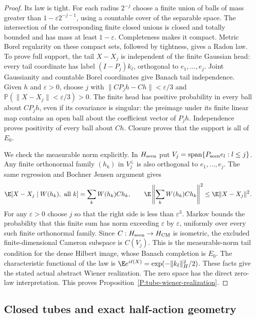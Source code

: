 \begin{proof}
  Its law is tight. For each radius $2^{-j}$ choose a finite union
  of balls of mass greater than $1-\varepsilon2^{-j-1}$,
  using a countable cover of the separable space.
  The intersection of the corresponding finite closed unions
  is closed and totally bounded and has mass at least $1-\varepsilon$.
  Completeness makes it compact.
  Metric Borel regularity on these compact sets, followed by tightness,
  gives a Radon law.
  To prove full support, the tail $X-X_j$ is independent of the
  finite Gaussian head: every tail coordinate has label
  $(I-P_j)k_\ell$, orthogonal to $e_1,\ldots,e_j$.
  Joint Gaussianity and countable Borel coordinates give Banach
  tail independence.
  Given $h$ and $\varepsilon>0$, choose $j$ with
  $\|CP_jh-Ch\|<\varepsilon/3$ and
  $\mathbb P(\|X-X_j\|<\varepsilon/3)>0$.
  The finite head has positive probability in every ball about
  $CP_jh$, even if its covariance is singular:
  the preimage under its finite linear map contains an open ball
  about the coefficient vector of $P_jh$.
  Independence proves positivity of every ball about $Ch$.
  Closure proves that the support is all of $E_0$.

  We check the measurable norm explicitly.
  In $H_{\rm seen}$ put $V_j=\operatorname{span}\{P_{\rm seen}e_l:l\le j\}$.
  Any finite orthonormal family $(h_k)$ in $V_j^\perp$
  is also orthogonal to $e_1,\ldots,e_j$.
  The same regression and Bochner Jensen argument gives
  \[
    \E[X-X_j\mid W(h_k),\hbox{ all }k]
    =\sum_k W(h_k)Ch_k,\qquad
    \E\left\|\sum_kW(h_k)Ch_k\right\|^2
    \le\E\|X-X_j\|^2 .
  \]
  For any $\varepsilon>0$ choose $j$ so that the right side
  is less than $\varepsilon^3$.
  Markov bounds the probability that this finite sum has norm
  exceeding $\varepsilon$ by $\varepsilon$, uniformly over every
  such finite orthonormal family.
  Since $C:H_{\rm seen}\to H_{\rm CM}$ is isometric, the excluded
  finite-dimensional Cameron subspace is $C(V_j)$.
  This is the measurable-norm tail condition for the dense Hilbert
  image, whose Banach completion is $E_0$.
  The characteristic functional of the law is
  $\E e^{i\ell(X)}=\exp(-\|k_\ell\|_H^2/2)$.
  These facts give the stated actual abstract Wiener realization.
  The zero space has the direct zero-law interpretation.
  This proves Proposition~\ref{P:tube-wiener-realization}.
\end{proof}

\subsection{Closed tubes and exact half-action geometry}

